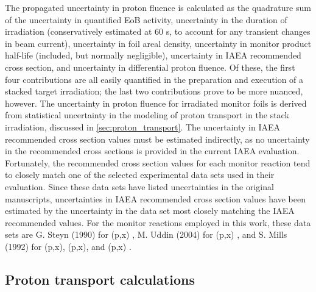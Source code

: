 \documentclass[%
 reprint,
superscriptaddress,
onecolumn,
linenumbers,
notitlepage,
 amsmath,amssymb,
 aps,
prc,
]{revtex4-1}
\begin{document}
The propagated uncertainty in proton fluence is calculated as the quadrature sum of the uncertainty in quantified EoB activity, uncertainty in the duration of irradiation (conservatively estimated at 60 s, to account for any transient changes in beam current), uncertainty in foil areal density, uncertainty in monitor product half-life (included, but normally negligible), uncertainty in IAEA recommended cross section, and uncertainty in differential proton fluence.
Of these, the first four contributions are all easily quantified in the preparation and execution of a stacked target irradiation;  the last two contributions prove to be more nuanced, however.
The uncertainty in proton fluence for irradiated monitor foils is derived from statistical uncertainty in the modeling of proton transport in the stack irradiation, discussed in \autoref{sec:proton_transport}.
The uncertainty in IAEA recommended cross section values must be estimated indirectly, as no uncertainty in the  recommended cross sections is provided in the current IAEA evaluation.
Fortunately, the recommended cross section values for each monitor reaction tend to closely match one of the   selected experimental data sets used in their evaluation.
Since these data sets have listed uncertainties in the original manuscripts, uncertainties in  IAEA recommended cross section values have been estimated by the uncertainty in the data set most closely matching the  IAEA recommended  values.
For the monitor reactions employed in this work, these data sets are G. Steyn (1990) for  (p,x) \cite{Steyn1990}, M. Uddin (2004) for (p,x) \cite{Uddin2004}, and S. Mills (1992) for (p,x), (p,x), and (p,x) \cite{Mills1992}.




\subsection{Proton transport calculations}\label{sec:proton_transport}
\end{document}
